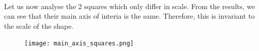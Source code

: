 \paragraph{}
Let us now analyse the 2 squares which only differ in scale. From the results, we can see that their main axis of interia is the same. Therefore, this is invariant to the scale of the shape.
\begin{figure}[H]
    \centering
    \texttt{[image: main\_axis\_squares.png]}
    \label{fig:main-axis-squares}
\end{figure}


